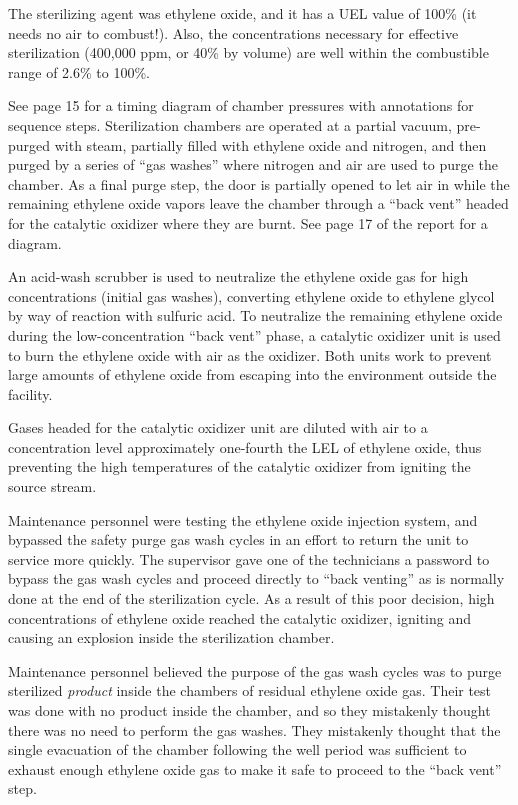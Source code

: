 
The sterilizing agent was ethylene oxide, and it has a UEL value of 100\% (it needs no air to combust!).  Also, the concentrations necessary for effective sterilization (400,000 ppm, or 40\% by volume) are well within the combustible range of 2.6\% to 100\%.

\vskip 10pt

See page 15 for a timing diagram of chamber pressures with annotations for sequence steps.  Sterilization chambers are operated at a partial vacuum, pre-purged with steam, partially filled with ethylene oxide and nitrogen, and then purged by a series of ``gas washes'' where nitrogen and air are used to purge the chamber.  As a final purge step, the door is partially opened to let air in while the remaining ethylene oxide vapors leave the chamber through a ``back vent'' headed for the catalytic oxidizer where they are burnt.  See page 17 of the report for a diagram.

\vskip 10pt

An acid-wash scrubber is used to neutralize the ethylene oxide gas for high concentrations (initial gas washes), converting ethylene oxide to ethylene glycol by way of reaction with sulfuric acid.  To neutralize the remaining ethylene oxide during the low-concentration ``back vent'' phase, a catalytic oxidizer unit is used to burn the ethylene oxide with air as the oxidizer.  Both units work to prevent large amounts of ethylene oxide from escaping into the environment outside the facility.

Gases headed for the catalytic oxidizer unit are diluted with air to a concentration level approximately one-fourth the LEL of ethylene oxide, thus preventing the high temperatures of the catalytic oxidizer from igniting the source stream.

\vskip 10pt

Maintenance personnel were testing the ethylene oxide injection system, and bypassed the safety purge gas wash cycles in an effort to return the unit to service more quickly.  The supervisor gave one of the technicians a password to bypass the gas wash cycles and proceed directly to ``back venting'' as is normally done at the end of the sterilization cycle.  As a result of this poor decision, high concentrations of ethylene oxide reached the catalytic oxidizer, igniting and causing an explosion inside the sterilization chamber.

\vskip 10pt

Maintenance personnel believed the purpose of the gas wash cycles was to purge sterilized {\it product} inside the chambers of residual ethylene oxide gas.  Their test was done with no product inside the chamber, and so they mistakenly thought there was no need to perform the gas washes.  They mistakenly thought that the single evacuation of the chamber following the well period was sufficient to exhaust enough ethylene oxide gas to make it safe to proceed to the ``back vent'' step.

